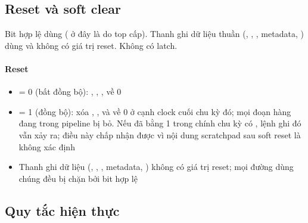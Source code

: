 \documentclass[10pt,a4paper]{article}
\begin{document}
\subsection{Reset và soft clear}\label{sec:7}

\begin{notebox}
Bit hợp lệ dùng  ( ở đây là  do top cấp). Thanh ghi dữ liệu thuần (, , , metadata, ) dùng  và không có giá trị reset. Không có latch.
\end{notebox}

\paragraph{Reset}\label{par:7-1}
\begin{itemize}
\item {} = 0 (bất đồng bộ): , , ,  về 0
\item {} = 1 (đồng bộ): xóa , ,  và  về 0 ở cạnh clock cuối chu kỳ đó; mọi đoạn hàng đang trong pipeline bị bỏ. Nếu  đã bằng 1 trong chính chu kỳ có , lệnh ghi đó vẫn xảy ra; điều này chấp nhận được vì nội dung scratchpad sau soft reset là không xác định
\item Thanh ghi dữ liệu (, , , metadata, ) không có giá trị reset; mọi đường dùng chúng đều bị chặn bởi bit hợp lệ
\end{itemize}

\subsection{Quy tắc hiện thực}\label{sec:8}
\end{document}
